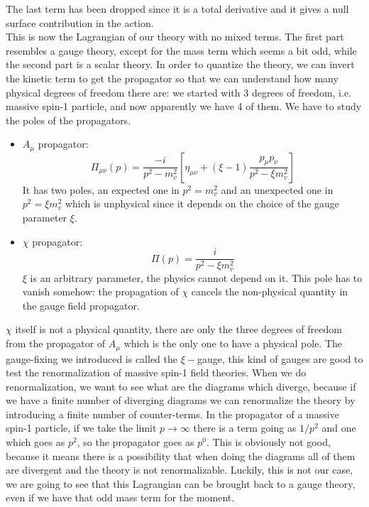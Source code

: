 \documentclass[../main.tex]{subfiles}
\begin{document}
The last term has been dropped since it is a total derivative and it gives a null surface contribution in the action.\\
This is now the Lagrangian of our theory with no mixed terms. The first part resembles a gauge theory, except for the mass term which seems a bit odd, while the second part is a scalar theory. In order to quantize the theory, we can invert the kinetic term to get the propagator so that we can understand how many physical degrees of freedom there are: we started with 3 degrees of freedom, i.e. massive spin-1 particle, and now apparently we have 4 of them. We have to study the poles of the propagators.
\begin{itemize}
    \item $A_\mu$ propagator:
    \[
    \Pi_{\mu\nu}(p)=\frac{-i}{p^2-m_v^2}\left[\eta_{\mu\nu}+(\xi-1)\frac{p_\mu p_\nu}{p^2-\xi m_v^2}\right]
    \]
    It has two poles, an expected one in $p^2=m_v^2$ and an unexpected one in $p^2=\xi m_v^2$ which is unphysical since it depends on the choice of the gauge parameter $\xi$.
    \item $\chi$ propagator:
    \[
    \Pi(p)=\frac{i}{p^2-\xi m_v^2}
    \]
    $\xi$ is an arbitrary parameter, the physics cannot depend on it. This pole has to vanish somehow: the propagation of $\chi$ cancels the non-physical quantity in the gauge field propagator. 
\end{itemize}
$\chi$ itself is not a physical quantity, there are only the three degrees of freedom from the propagator of $A_\mu$ which is the only one to have a physical pole.
The gauge-fixing we introduced is called the $\xi-$gauge, this kind of gauges are good to test the renormalization of massive spin-1 field theories. When we do renormalization, we want to see what are the diagrams which diverge, because if we have a finite number of diverging diagrams we can renormalize the theory by introducing a finite number of counter-terms. In the propagator of a massive spin-1 particle, if we take the limit $p\to\infty$ there is a term going as $1/p^2$ and one which goes as $p^2$, so the propagator goes as $p^0$. This is obviously not good, because it means there is a possibility that when doing the diagrams all of them are divergent and the theory is not renormalizable. Luckily, this is not our case, we are going to see that this Lagrangian can be brought back to a gauge theory, even if we have that odd mass term for the moment.\\
\end{document}

